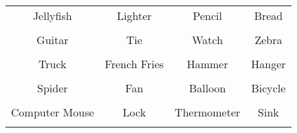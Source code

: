 \documentclass[12pt,a4paper]{article}
\begin{document}
\thispagestyle{empty}
\begin{table}[]
\centering
\Huge
\begin{tabular}{cccc}
 Jellyfish& Lighter& Pencil& Bread\\  & & & \\
 Guitar& Tie& Watch& Zebra\\  & & & \\
 Truck& French Fries& Hammer& Hanger\\  & & & \\
 Spider& Fan& Balloon& Bicycle\\  & & & \\
 Computer Mouse& Lock& Thermometer& Sink\\  & & & \\
\end{tabular}
\end{table}
\end{document}
